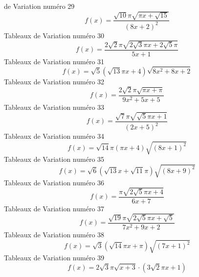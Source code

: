 \documentclass{article}
\begin{document}
de Variation num\'ero 29 \[f(x) = \frac{\sqrt{10} \pi \sqrt{\pi x + \sqrt{15}}}{\left(8 x + 2\right)^{2}}\]Tableaux de Variation num\'ero 30 \[f(x) = \frac{2 \sqrt{2} \pi \sqrt{2 \sqrt{3} \pi x + 2 \sqrt{5} \pi}}{5 x + 1}\]Tableaux de Variation num\'ero 31 \[f(x) = \sqrt{5} \left(\sqrt{13} \pi x + 4\right) \sqrt{8 x^{2} + 8 x + 2}\]Tableaux de Variation num\'ero 32 \[f(x) = \frac{2 \sqrt{2} \pi \sqrt{\pi x + \pi}}{9 x^{2} + 5 x + 5}\]Tableaux de Variation num\'ero 33 \[f(x) = \frac{\sqrt{7} \pi \sqrt{\sqrt{5} \pi x + 1}}{\left(2 x + 5\right)^{2}}\]Tableaux de Variation num\'ero 34 \[f(x) = \sqrt{14} \pi \left(\pi x + 4\right) \sqrt{\left(8 x + 1\right)^{2}}\]Tableaux de Variation num\'ero 35 \[f(x) = \sqrt{6} \left(\sqrt{13} x + \sqrt{11} \pi\right) \sqrt{\left(8 x + 9\right)^{2}}\]Tableaux de Variation num\'ero 36 \[f(x) = \frac{\pi \sqrt{2 \sqrt{5} \pi x + 4}}{6 x + 7}\]Tableaux de Variation num\'ero 37 \[f(x) = \frac{\sqrt{19} \pi \sqrt{2 \sqrt{5} \pi x + \sqrt{5}}}{7 x^{2} + 9 x + 2}\]Tableaux de Variation num\'ero 38 \[f(x) = \sqrt{3} \left(\sqrt{14} \pi x + \pi\right) \sqrt{\left(7 x + 1\right)^{2}}\]Tableaux de Variation num\'ero 39 \[f(x) = 2 \sqrt{3} \pi \sqrt{x + 3} \cdot \left(3 \sqrt{2} \pi x + 1\right)\]
\end{document}
